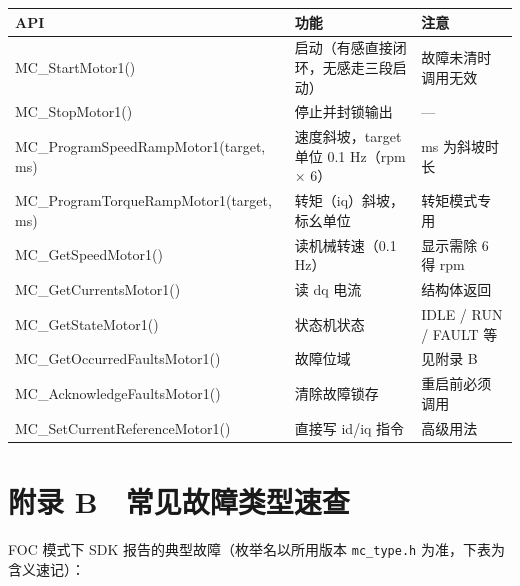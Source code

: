 \documentclass[
  UTF8,
  scheme=plain,
  fontsize=10pt,
  openany
]{ctexbook}
\begin{document}
{\def\LTcaptype{none} %
\begin{longtable}[]{@{}
  >{\raggedright\arraybackslash}p{}
  >{\raggedright\arraybackslash}p{}
  >{\raggedright\arraybackslash}p{}@{}}
\toprule\noalign{}
\begin{minipage}[b]{\linewidth}\raggedright
API
\end{minipage} & \begin{minipage}[b]{\linewidth}\raggedright
功能
\end{minipage} & \begin{minipage}[b]{\linewidth}\raggedright
注意
\end{minipage} \\
\midrule\noalign{}
\endhead
\bottomrule\noalign{}
\endlastfoot
MC\_StartMotor1() & 启动（有感直接闭环，无感走三段启动） &
故障未清时调用无效 \\
MC\_StopMotor1() & 停止并封锁输出 & --- \\
MC\_ProgramSpeedRampMotor1(target, ms) & 速度斜坡，target 单位 0.1
Hz（rpm × 6） & ms 为斜坡时长 \\
MC\_ProgramTorqueRampMotor1(target, ms) & 转矩（iq）斜坡，标幺单位 &
转矩模式专用 \\
MC\_GetSpeedMotor1() & 读机械转速（0.1 Hz） & 显示需除 6 得 rpm \\
MC\_GetCurrentsMotor1() & 读 dq 电流 & 结构体返回 \\
MC\_GetStateMotor1() & 状态机状态 & IDLE / RUN / FAULT 等 \\
MC\_GetOccurredFaultsMotor1() & 故障位域 & 见附录 B \\
MC\_AcknowledgeFaultsMotor1() & 清除故障锁存 & 重启前必须调用 \\
MC\_SetCurrentReferenceMotor1() & 直接写 id/iq 指令 & 高级用法 \\
\end{longtable}
}

\section*{附录
B　常见故障类型速查}\label{ux9644ux5f55-b-ux5e38ux89c1ux6545ux969cux7c7bux578bux901fux67e5}

FOC 模式下 SDK 报告的典型故障（枚举名以所用版本 \texttt{mc\_type.h}
为准，下表为含义速记）：
\end{document}
